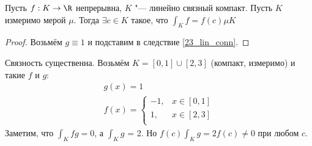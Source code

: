 \begin{conseq}
	Пусть $f : K \to \R$ непрерывна, $K$ "--- линейно связный компакт.
	Пусть $K$ измеримо мерой $\mu$.
	Тогда $\exists c \in K$ такое, что $\int_K f = f(c) \mu K$
\end{conseq}
\begin{proof}
	Возьмём $g \equiv 1$ и подставим в следствие \ref{23_lin_conn}.
\end{proof}
\begin{exmp}
	Связность существенна.
	Возьмём $K = [0,1] \cup [2,3]$ (компакт, измеримо) и такие $f$ и $g$:
	\begin{gather*}
	g(x) = 1 \\
	f(x) = \begin{cases}
		-1, & x \in [0,1] \\
		1, & x \in [2,3] \\
	\end{cases}
	\end{gather*}
	Заметим, что $\int_K fg = 0$, а $\int_K g$ = 2.
	Но $f(c) \int_K g = 2f(c) \neq 0$ при любом $c$.
\end{exmp}

